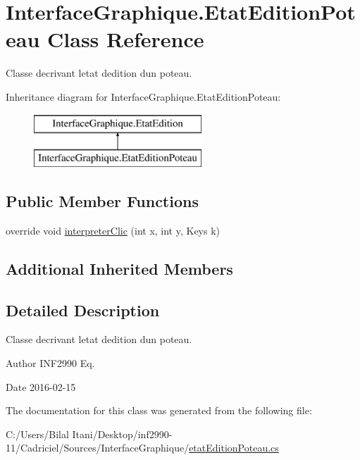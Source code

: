 \hypertarget{class_interface_graphique_1_1_etat_edition_poteau}{}\section{Interface\+Graphique.\+Etat\+Edition\+Poteau Class Reference}
\label{class_interface_graphique_1_1_etat_edition_poteau}


Classe decrivant l\textquotesingle{}etat d\textquotesingle{}edition d\textquotesingle{}un poteau.  


Inheritance diagram for Interface\+Graphique.\+Etat\+Edition\+Poteau\+:\begin{figure}[H]
\begin{center}
\leavevmode
\includegraphics[height=2.000000cm]{class_interface_graphique_1_1_etat_edition_poteau}
\end{center}
\end{figure}
\subsection*{Public Member Functions}
\begin{DoxyCompactItemize}
\item 
override void \hyperlink{group__inf2990_ga02ab06168c741d02e3ff643247aba300}{interpreter\+Clic} (int x, int y, Keys k)
\end{DoxyCompactItemize}
\subsection*{Additional Inherited Members}


\subsection{Detailed Description}
Classe decrivant l\textquotesingle{}etat d\textquotesingle{}edition d\textquotesingle{}un poteau. 

\begin{DoxyAuthor}{Author}
I\+N\+F2990 Eq. 
\end{DoxyAuthor}
\begin{DoxyDate}{Date}
2016-\/02-\/15 
\end{DoxyDate}


The documentation for this class was generated from the following file\+:\begin{DoxyCompactItemize}
\item 
C\+:/\+Users/\+Bilal Itani/\+Desktop/inf2990-\/11/\+Cadriciel/\+Sources/\+Interface\+Graphique/\hyperlink{etat_edition_poteau_8cs}{etat\+Edition\+Poteau.\+cs}\end{DoxyCompactItemize}

